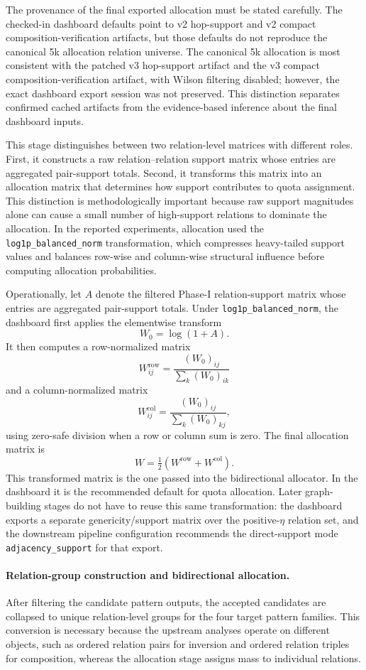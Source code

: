 \documentclass[12pt,a4paper]{article}
\begin{document}
The provenance of the final exported allocation must be stated carefully. The checked-in dashboard defaults point to v2 hop-support and v2 compact composition-verification artifacts, but those defaults do not reproduce the canonical 5k allocation relation universe. The canonical 5k allocation is most consistent with the patched v3 hop-support artifact and the v3 compact composition-verification artifact, with Wilson filtering disabled; however, the exact dashboard export session was not preserved. This distinction separates confirmed cached artifacts from the evidence-based inference about the final dashboard inputs.

This stage distinguishes between two relation-level matrices with different roles. First, it constructs a raw relation--relation support matrix whose entries are aggregated pair-support totals. Second, it transforms this matrix into an allocation matrix that determines how support contributes to quota assignment. This distinction is methodologically important because raw support magnitudes alone can cause a small number of high-support relations to dominate the allocation. In the reported experiments, allocation used the \texttt{log1p\_balanced\_norm} transformation, which compresses heavy-tailed support values and balances row-wise and column-wise structural influence before computing allocation probabilities.

Operationally, let \(A\) denote the filtered Phase-I relation-support matrix whose entries are aggregated pair-support totals. Under \texttt{log1p\_balanced\_norm}, the dashboard first applies the elementwise transform
\[
W_0 = \log(1 + A).
\]
It then computes a row-normalized matrix
\[
W^{\mathrm{row}}_{ij} = \frac{(W_0)_{ij}}{\sum_k (W_0)_{ik}}
\]
and a column-normalized matrix
\[
W^{\mathrm{col}}_{ij} = \frac{(W_0)_{ij}}{\sum_k (W_0)_{kj}},
\]
using zero-safe division when a row or column sum is zero. The final allocation matrix is
\[
W = \tfrac{1}{2}\left(W^{\mathrm{row}} + W^{\mathrm{col}}\right).
\]
This transformed matrix is the one passed into the bidirectional allocator. In the dashboard it is the recommended default for quota allocation. Later graph-building stages do not have to reuse this same transformation: the dashboard exports a separate genericity/support matrix over the positive-\(\eta\) relation set, and the downstream pipeline configuration recommends the direct-support mode \texttt{adjacency\_support} for that export.


\paragraph{Relation-group construction and bidirectional allocation.}
After filtering the candidate pattern outputs, the accepted candidates are collapsed to unique relation-level groups for the four target pattern families. %
This conversion is necessary because the upstream analyses operate on different objects, such as ordered relation pairs for inversion and ordered relation triples for composition, whereas the allocation stage assigns mass to individual relations.
\end{document}
